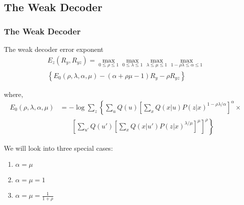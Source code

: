 \documentclass[mathserif]{beamer}
\begin{document}
\subsection{The Weak Decoder}
\begin{frame}
\frametitle{The Weak Decoder}
\begin{block}{The weak decoder error exponent}
\begin{align*}
    E_z(R_y,R_{yz})=\max_{0\le\rho\le 1}\max_{0\le\lambda\le 1}\max_{\lambda\le\mu\le 1}\max_{
    1-\rho\lambda\le\alpha\le 1}\\
    \left\{E_0(\rho,\lambda,\alpha,\mu)-(\alpha+\rho\mu-1)R_y-\rho
    R_{yz}\right\}
\end{align*}
\end{block}
where,
\footnotesize
\begin{align*}
     E_0(\rho,\lambda,\alpha,\mu) &= -\log\sum_z\left\{\sum_{u}Q(u)\left[\sum_xQ(x|u) P(z|x)^{1-\rho\lambda/\alpha}\right]^\alpha\right.\times\\
     &~~~~~~~~\left.\left[\sum_{u'}Q(u')\left[\sum_xQ(x|u') P(z|x)^{\lambda/\mu}\right]^\mu\right]^{\rho}\right\}
\end{align*}

\normalsize We will look into three special cases:
\pause
\begin{enumerate}
\item $\alpha=\mu$
\pause
\item $\alpha=\mu=1$
\item $\alpha=\mu=\frac 1 {1+\rho}$
\end{enumerate}
\end{frame}
\end{document}
